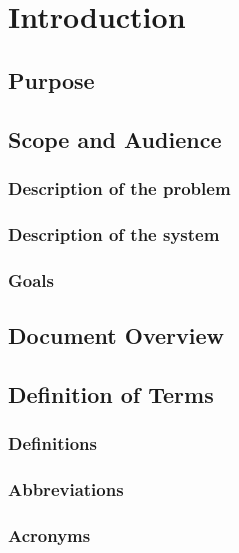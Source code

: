 \documentclass[a4paper]{article}
\begin{document}

\tableofcontents
\newpage
\listoffigures
\newpage
\section{Introduction}

    \subsection{Purpose}
    
    \subsection{Scope and Audience}
        \subsubsection{Description of the problem}
        
        \subsubsection{Description of the system}
        
        \subsubsection{Goals}
    
    \subsection{Document Overview}
    
    \subsection{Definition of Terms}
    
        \subsubsection{Definitions}

        \subsubsection{Abbreviations}
        
        \subsubsection{Acronyms}
            \begin{acronym}
            \end{acronym}
    
\end{document}
